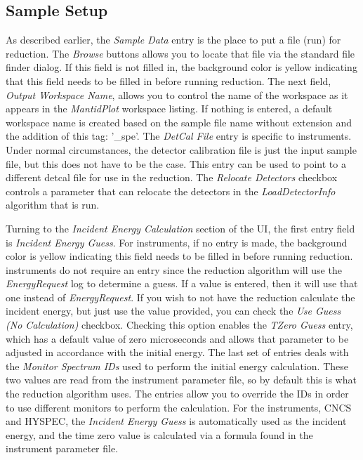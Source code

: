 \subsection{Sample Setup}
As described earlier, the \textit{Sample Data} entry is the place to put a file (run) for reduction. The \textit{Browse} buttons allows you to locate that file via the standard file finder dialog. If this field is not filled in, the background color is yellow indicating that this field needs to be filled in before running reduction. The next field, \textit{Output Workspace Name}, allows you to control the name of the workspace as it appears in the \textit{MantidPlot} workspace listing. If nothing is entered, a default workspace name is created based on the sample file name without extension and the addition of this tag: '\_spe'. The \textit{DetCal File} entry is specific to \isis{} instruments. Under normal circumstances, the detector calibration file is just the input sample file, but this does not have to be the case. This entry can be used to point to a different detcal file for use in the reduction. The \textit{Relocate Detectors} checkbox controls a parameter that can relocate the detectors in the \textit{LoadDetectorInfo} \mantid{} algorithm that is run. 

Turning to the \textit{Incident Energy Calculation} section of the UI, the first entry field is \textit{Incident Energy Guess}. For \isis{} instruments, if no entry is made, the background color is yellow indicating this field needs to be filled in before running reduction. \sns{} instruments do not require an entry since the reduction algorithm will use the \textit{EnergyRequest} log to determine a guess. If a value is entered, then it will use that one instead of \textit{EnergyRequest}. If you wish to not have the reduction calculate the incident energy, but just use the value provided, you can check the \textit{Use Guess (No Calculation)} checkbox. Checking this option enables the \textit{TZero Guess} entry, which has a default value of zero microseconds and allows that parameter to be adjusted in accordance with the initial energy. The last set of entries deals with the \textit{Monitor Spectrum IDs} used to perform the initial energy calculation. These two values are read from the instrument parameter file, so by default this is what the reduction algorithm uses. The entries allow you to override the IDs in order to use different monitors to perform the calculation. For the \sns{} instruments, CNCS and HYSPEC, the \textit{Incident Energy Guess} is automatically used as the incident energy, and the time zero value is calculated via a formula found in the instrument parameter file.

